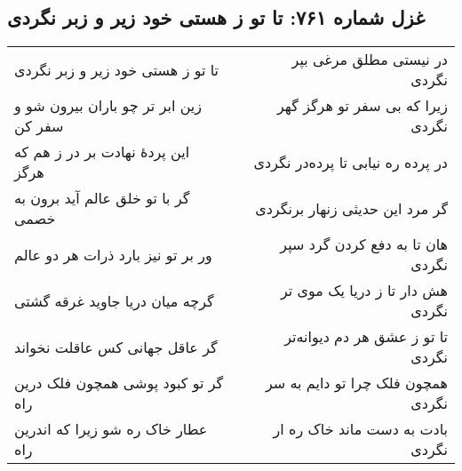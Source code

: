 \begin{center}
\section*{غزل شماره ۷۶۱: تا تو ز هستی خود زیر و زبر نگردی}
\label{sec:761}
\begin{longtable}{l p{0.5cm} r}
تا تو ز هستی خود زیر و زبر نگردی
&&
در نیستی مطلق مرغی بپر نگردی
\\
زین ابر تر چو باران بیرون شو و سفر کن
&&
زیرا که بی سفر تو هرگز گهر نگردی
\\
این پردهٔ نهادت بر در ز هم که هرگز
&&
در پرده ره نیابی تا پرده‌در نگردی
\\
گر با تو خلق عالم آید برون به خصمی
&&
گر مرد این حدیثی زنهار برنگردی
\\
ور بر تو نیز بارد ذرات هر دو عالم
&&
هان تا به دفع کردن گرد سپر نگردی
\\
گرچه میان دریا جاوید غرقه گشتی
&&
هش دار تا ز دریا یک موی تر نگردی
\\
گر عاقل جهانی کس عاقلت نخواند
&&
تا تو ز عشق هر دم دیوانه‌تر نگردی
\\
گر تو کبود پوشی همچون فلک درین راه
&&
همچون فلک چرا تو دایم به سر نگردی
\\
عطار خاک ره شو زیرا که اندرین راه
&&
بادت به دست ماند خاک ره ار نگردی
\\
\end{longtable}
\end{center}
